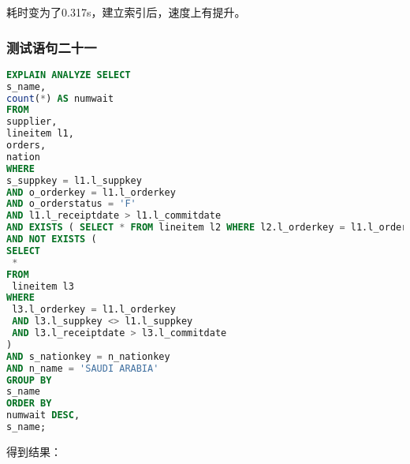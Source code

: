 \documentclass{article}
\begin{document}
耗时变为了0.317s，建立索引后，速度上有提升。

\subsubsection{测试语句二十一}

\begin{lstlisting}[language=sql]
EXPLAIN ANALYZE SELECT
s_name,
count(*) AS numwait 
FROM
supplier,
lineitem l1,
orders,
nation 
WHERE
s_suppkey = l1.l_suppkey 
AND o_orderkey = l1.l_orderkey 
AND o_orderstatus = 'F' 
AND l1.l_receiptdate > l1.l_commitdate 
AND EXISTS ( SELECT * FROM lineitem l2 WHERE l2.l_orderkey = l1.l_orderkey AND l2.l_suppkey <> l1.l_suppkey ) 
AND NOT EXISTS (
SELECT
 * 
FROM
 lineitem l3 
WHERE
 l3.l_orderkey = l1.l_orderkey 
 AND l3.l_suppkey <> l1.l_suppkey 
 AND l3.l_receiptdate > l3.l_commitdate 
) 
AND s_nationkey = n_nationkey 
AND n_name = 'SAUDI ARABIA' 
GROUP BY
s_name 
ORDER BY
numwait DESC,
s_name;
\end{lstlisting}

得到结果：
\end{document}
